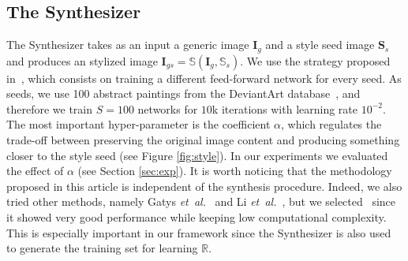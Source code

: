 \documentclass{sig-alternate-05-2015}
\begin{document}
\subsection{The Synthesizer}
\label{sec:synthesis}
The {Synthesizer} takes as an input a generic image $\textbf{I}_g$ and a style seed image $\textbf{S}_s$ and produces an stylized image $\mathbf{I}_{gs} = \mathbb{S}(\textbf{I}_g,\mathbb{S}_s)$. We use the strategy proposed in~\cite{ulyanov2016texture}, which consists on training a different feed-forward network for every seed. As seeds, we use 100 abstract paintings from the DeviantArt database~\cite{sartori2015affective}, and therefore we train $S=100$ networks for $10$k iterations with learning rate $10^{-2}$. The most important hyper-parameter is the coefficient $\alpha$, which regulates the trade-off between preserving the original image content and producing something closer to the style seed (see Figure \ref{fig:style}). In our experiments we evaluated the effect of $\alpha$ (see Section \ref{sec:exp}). %
It is worth noticing that the methodology proposed in this article is independent of the synthesis procedure. Indeed, we also tried other methods, namely Gatys \textit{et\ al.}~\cite{gatys2015neural} and Li \textit{et\ al.}~\cite{li2016precomputed}, but we selected~\cite{ulyanov2016texture} since it showed very good performance while keeping low computational complexity. This is especially important in our framework since the Synthesizer is also used to generate the training set for learning $\mathbb{R}$. %
\end{document}
